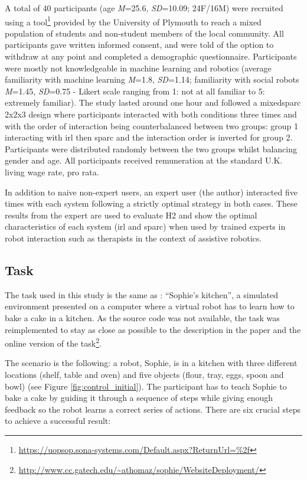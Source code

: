 A total of 40 participants (age \textit{M}=25.6, \textit{SD}=10.09; 24F/16M) were recruited using a tool\footnote{\url{https://uopsop.sona-systems.com/Default.aspx?ReturnUrl=\%2f}} provided by the University of Plymouth to reach a mixed population of students and non-student members of the local community.  All participants gave written informed consent, and were told of the option to withdraw at any point and completed a demographic questionnaire. Participants were mostly not knowledgeable in machine learning and robotics (average familiarity with machine learning \textit{M}=1.8, \textit{SD}=1.14; familiarity with social robots \textit{M}=1.45, \textit{SD}=0.75 - Likert scale ranging from 1: not at all familiar to 5: extremely familiar). The study lasted around one hour and followed a mixedsparc 2x2x3 design where participants interacted with both conditions three times and with the order of interaction being counterbalanced between two groups: group 1 interacting with \gls{irl} then \gls{sparc} and the interaction order is inverted for group 2. Participants were distributed randomly between the two groups whilst balancing gender and age. All participants received remuneration at the standard U.K. living wage rate, pro rata. 

In addition to naive non-expert users, an expert user (the author) interacted five times with each system following a strictly optimal strategy in both cases. These results from the expert are used to evaluate H2 and show the optimal characteristics of each system (\gls{irl} and \gls{sparc}) when used by trained experts in robot interaction such as therapists in the context of assistive robotics.


\subsection{Task} \label{ssec:control_task}

The task used in this study is the same as \cite{thomaz2008teachable}: ``Sophie's kitchen'', a simulated environment presented on a computer where a virtual robot has to learn how to bake a cake in a kitchen. As the source code was not available, the task was reimplemented to stay as close as possible to the description in the paper and the online version of the task\footnote{\url{http://www.cc.gatech.edu/~athomaz/sophie/WebsiteDeployment/}}.

The scenario is the following: a robot, Sophie, is in a kitchen with three different locations (shelf, table and oven) and five objects (flour, tray, eggs, spoon and bowl) (see Figure \ref{fig:control_initial}). The participant has to teach Sophie to bake a cake by guiding it through a sequence of steps while giving enough feedback so the robot learns a correct series of actions. There are six crucial steps to achieve a successful result:

